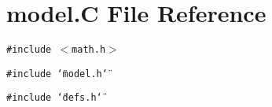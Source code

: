 \section{model.C File Reference}
\label{model_8C}
{\tt \#include $<$math.h$>$}\par
{\tt \#include \char`\"{}model.h\char`\"{}}\par
{\tt \#include \char`\"{}defs.h\char`\"{}}\par
